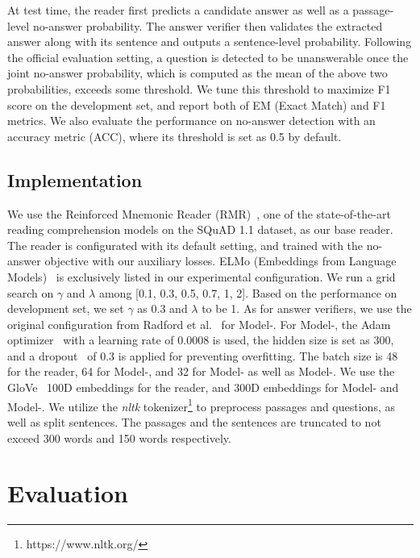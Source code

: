 \documentclass[letterpaper]{article} \usepackage{aaai19}  \usepackage{times}  \usepackage{helvet}  \usepackage{courier}  \usepackage{url}  \usepackage{graphicx}  \usepackage{pbox}
\begin{document}
At test time, the reader first predicts a candidate answer as well as a passage-level no-answer probability. 
The answer verifier then validates the extracted answer along with its sentence and outputs a sentence-level probability. 
Following the official evaluation setting, a question is detected to be unanswerable once the joint no-answer probability, which is computed as the mean of the above two probabilities, exceeds some threshold.
We tune this threshold to maximize F1 score on the development set, and report both of EM (Exact Match) and F1 metrics.
We also evaluate the performance on no-answer detection with an accuracy metric (ACC), where its threshold is set as 0.5 by default.

\subsection{Implementation}
We use the Reinforced Mnemonic Reader (RMR)~\cite{Hu17}, one of the state-of-the-art reading comprehension models on the SQuAD 1.1 dataset, as our base reader.
The reader is configurated with its default setting, and trained with the no-answer objective with our auxiliary losses.
ELMo (Embeddings from Language Models)~\cite{Elmo17} is exclusively listed in our experimental configuration.
We run a grid search on $\gamma$ and $\lambda$ among [0.1, 0.3, 0.5, 0.7, 1, 2]. 
Based on the performance on development set, we set $\gamma$ as 0.3 and $\lambda$ to be 1.
As for answer verifiers, we use the original configuration from Radford et al.~ for Model-\uppercase\expandafter{}.
For Model-\uppercase\expandafter{}, the Adam optimizer~\cite{Kingma14} with a learning rate of 0.0008 is used, the hidden size is set as 300, and a dropout~\cite{Srivastava14} of 0.3 is applied for preventing overfitting.
The batch size is 48 for the reader, 64 for Model-\uppercase\expandafter{}, and 32 for Model-\uppercase\expandafter{} as well as Model-\uppercase\expandafter{}. 
We use the GloVe~\cite{Pennington14} 100D embeddings for the reader, and 300D embeddings for Model-\uppercase\expandafter{} and Model-\uppercase\expandafter{}.
We utilize the \emph{nltk} tokenizer\footnote{https://www.nltk.org/} to preprocess passages and questions, as well as split sentences.
The passages and the sentences are truncated to not exceed 300 words and 150 words respectively. \section{Evaluation}
\end{document}
